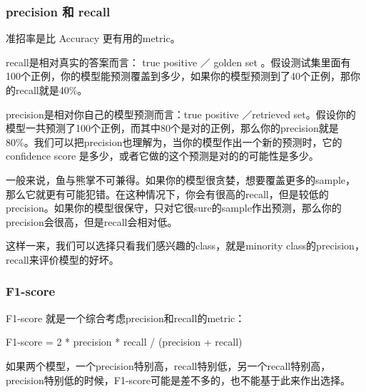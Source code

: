 \documentclass[12pt]{article}
\begin{document}
\subsubsection{precision 和 recall}
准招率是比 Accuracy 更有用的metric。

recall是相对真实的答案而言： true positive ／ golden set 。假设测试集里面有100个正例，你的模型能预测覆盖到多少，如果你的模型预测到了40个正例，那你的recall就是40\%。

precision是相对你自己的模型预测而言：true positive ／retrieved set。假设你的模型一共预测了100个正例，而其中80个是对的正例，那么你的precision就是80\%。我们可以把precision也理解为，当你的模型作出一个新的预测时，它的confidence score 是多少，或者它做的这个预测是对的的可能性是多少。

一般来说，鱼与熊掌不可兼得。如果你的模型很贪婪，想要覆盖更多的sample，那么它就更有可能犯错。在这种情况下，你会有很高的recall，但是较低的precision。如果你的模型很保守，只对它很sure的sample作出预测，那么你的precision会很高，但是recall会相对低。

这样一来，我们可以选择只看我们感兴趣的class，就是minority class的precision，recall来评价模型的好坏。

\subsubsection{F1-score}
F1-score 就是一个综合考虑precision和recall的metric： 

\begin{center}
    F1-score = 2 * precision * recall / (precision + recall)
\end{center}

如果两个模型，一个precision特别高，recall特别低，另一个recall特别高，precision特别低的时候，F1-score可能是差不多的，也不能基于此来作出选择。



\end{document}
